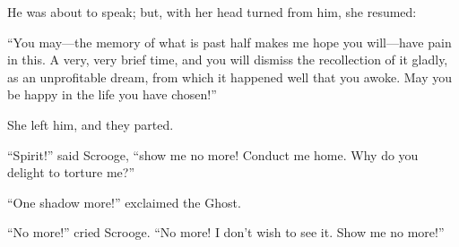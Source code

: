 \documentclass[paper=5.5in:8.5in,BCOR=15mm,twoside,DIV=15,headinclude=off,12pt,chapterprefix=off,openany,headings=huge]{scrbook} %
\begin{document}
He was about to speak; but, with her head turned from him, she resumed:

\enquote{You may—the memory of what is past half makes me hope you will—have pain in this. A very, very brief time, and you will dismiss the recollection of it gladly, as an unprofitable dream, from which it happened well that you awoke. May you be happy in the life you have chosen!}

She left him, and they parted.

\enquote{Spirit!} said Scrooge, \enquote{show me no more! Conduct me home. Why do you delight to torture me?}

\enquote{One shadow more!} exclaimed the Ghost.

\enquote{No more!} cried Scrooge. \enquote{No more! I don't wish to see it. Show me no more!}
\end{document}
